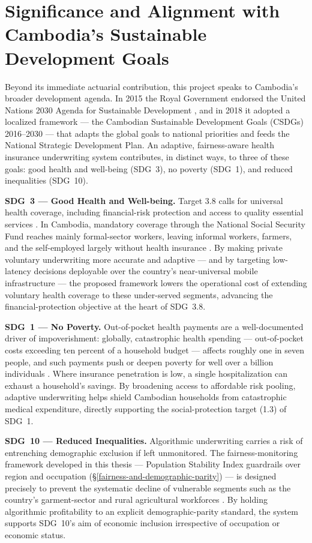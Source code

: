 \section{Significance and Alignment with Cambodia's Sustainable Development Goals}\label{significance-and-sdg-alignment}

Beyond its immediate actuarial contribution, this project speaks to Cambodia's broader development agenda. In 2015 the Royal Government endorsed the United Nations 2030 Agenda for Sustainable Development \citep{UN2015}, and in 2018 it adopted a localized framework --- the Cambodian Sustainable Development Goals (CSDGs) 2016--2030 \citep{RGC2018} --- that adapts the global goals to national priorities and feeds the National Strategic Development Plan. An adaptive, fairness-aware health insurance underwriting system contributes, in distinct ways, to three of these goals: good health and well-being (SDG~3), no poverty (SDG~1), and reduced inequalities (SDG~10).

\textbf{SDG~3 --- Good Health and Well-being.} Target 3.8 calls for universal health coverage, including financial-risk protection and access to quality essential services \citep{WHO2023}. In Cambodia, mandatory coverage through the National Social Security Fund reaches mainly formal-sector workers, leaving informal workers, farmers, and the self-employed largely without health insurance \citep{ILO2022}. By making private voluntary underwriting more accurate and adaptive --- and by targeting low-latency decisions deployable over the country's near-universal mobile infrastructure --- the proposed framework lowers the operational cost of extending voluntary health coverage to these under-served segments, advancing the financial-protection objective at the heart of SDG~3.8.

\textbf{SDG~1 --- No Poverty.} Out-of-pocket health payments are a well-documented driver of impoverishment: globally, catastrophic health spending --- out-of-pocket costs exceeding ten percent of a household budget --- affects roughly one in seven people, and such payments push or deepen poverty for well over a billion individuals \citep{WHO2023}. Where insurance penetration is low, a single hospitalization can exhaust a household's savings. By broadening access to affordable risk pooling, adaptive underwriting helps shield Cambodian households from catastrophic medical expenditure, directly supporting the social-protection target (1.3) of SDG~1.

\textbf{SDG~10 --- Reduced Inequalities.} Algorithmic underwriting carries a risk of entrenching demographic exclusion if left unmonitored. The fairness-monitoring framework developed in this thesis --- Population Stability Index guardrails over region and occupation (\S\ref{fairness-and-demographic-parity}) --- is designed precisely to prevent the systematic decline of vulnerable segments such as the country's garment-sector and rural agricultural workforces \citep{ILO2022}. By holding algorithmic profitability to an explicit demographic-parity standard, the system supports SDG~10's aim of economic inclusion irrespective of occupation or economic status.

